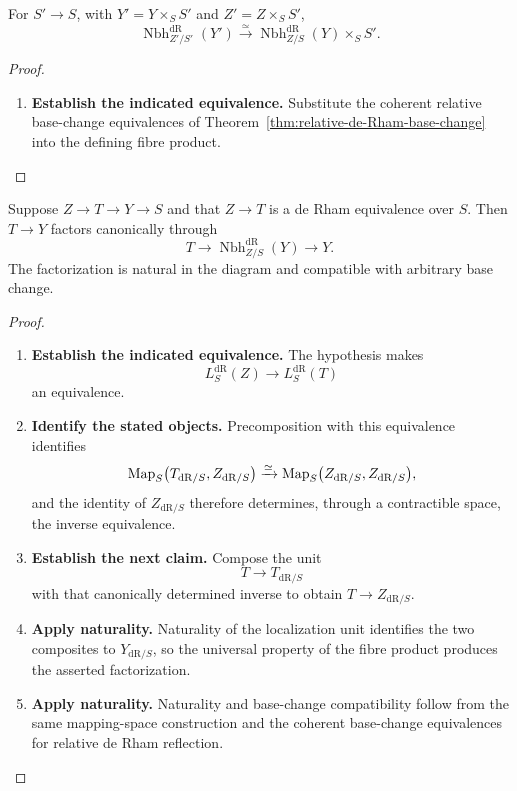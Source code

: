 \begin{proposition}
\label{prop:de-Rham-neighbourhood-base-change}
For \(S'\to S\), with \(Y'=Y\times_SS'\) and \(Z'=Z\times_SS'\),
\[
  \operatorname{Nbh}^{\mathrm{dR}}_{Z'/S'}(Y')
  \xrightarrow{\simeq}
  \operatorname{Nbh}^{\mathrm{dR}}_{Z/S}(Y)\times_SS'.
\]
\end{proposition}

\begin{proof}
\leavevmode
\begin{enumerate}[label=\textup{(\arabic*)}]
    \item \textbf{Establish the indicated equivalence.}
    Substitute the coherent relative base-change equivalences of
    Theorem~\ref{thm:relative-de-Rham-base-change} into the defining fibre product.
\end{enumerate}
\end{proof}

\begin{proposition}
\label{prop:de-Rham-neighbourhood-factorization}
Suppose \(Z\to T\to Y\to S\) and that \(Z\to T\) is a de Rham equivalence
over \(S\). Then \(T\to Y\) factors canonically through
\[
  T\longrightarrow
  \operatorname{Nbh}^{\mathrm{dR}}_{Z/S}(Y)
  \longrightarrow Y.
\]
The factorization is natural in the diagram and compatible with arbitrary base
change.
\end{proposition}

\begin{proof}
\leavevmode
\begin{enumerate}[label=\textup{(\arabic*)}]
    \item \textbf{Establish the indicated equivalence.}
    The hypothesis makes
    \[
    L^{\mathrm{dR}}_S(Z)\longrightarrow L^{\mathrm{dR}}_S(T)
    \]
    an equivalence.
    \item \textbf{Identify the stated objects.}
    Precomposition with this equivalence identifies
    \[
    \operatorname{Map}_S\bigl(T_{\mathrm{dR}/S},Z_{\mathrm{dR}/S}\bigr)
    \xrightarrow{\simeq}
    \operatorname{Map}_S\bigl(Z_{\mathrm{dR}/S},Z_{\mathrm{dR}/S}\bigr),
    \]
    and the identity of \(Z_{\mathrm{dR}/S}\) therefore determines, through a
    contractible space, the inverse equivalence.
    \item \textbf{Establish the next claim.}
    Compose the unit
    \[
    T\longrightarrow T_{\mathrm{dR}/S}
    \]
    with that canonically determined inverse to obtain
    \(T\to Z_{\mathrm{dR}/S}\).
    \item \textbf{Apply naturality.}
    Naturality of the localization unit identifies the
    two composites to \(Y_{\mathrm{dR}/S}\), so the universal property of the fibre
    product produces the asserted factorization.
    \item \textbf{Apply naturality.}
    Naturality and base-change
    compatibility follow from the same mapping-space construction and the coherent
    base-change equivalences for relative de Rham reflection.
\end{enumerate}
\end{proof}

